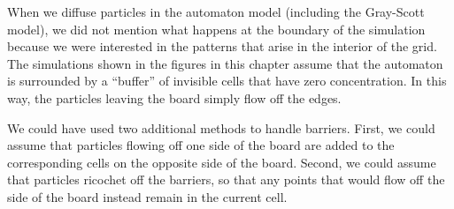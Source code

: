 \begin{exercise}[%
Try changing the diffusion rates in the Gray-Scott model to the values of  $d_A = 0.1$ and $d_B = 0.05$. Do the same patterns result? What happens if we make the diffusion rates equal?
]\end{exercise}

When we diffuse particles in the automaton model (including the Gray-Scott model), we did not mention what happens at the boundary of the simulation because we were interested in the patterns that arise in the interior of the grid. The simulations shown in the figures in this chapter assume that the automaton is surrounded by a ``buffer'' of invisible cells that have zero concentration. In this way, the particles leaving the board simply flow off the edges.

We could have used two additional methods to handle barriers. First, we could assume that particles flowing off one side of the board are added to the corresponding cells on the opposite side of the board. Second, we could assume that particles ricochet off the barriers, so that any points that would flow off the side of the board instead remain in the current cell.\\

\begin{exercise}\end{exercise}

\newpage

\phantom{x}
\thispagestyle{empty}

\newpage
